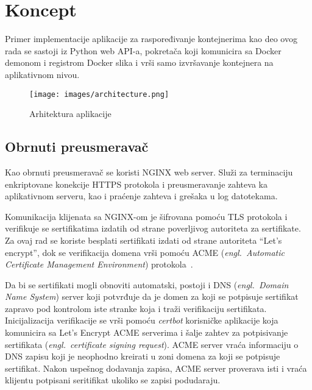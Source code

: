 \documentclass[12pt]{report}
\begin{document}

\chapter{Koncept}

Primer implementacije aplikacije za raspoređivanje kontejnerima kao deo ovog rada se sastoji iz Python web API-a, pokretača koji komunicira sa Docker demonom i registrom Docker slika i vrši samo izvršavanje kontejnera na aplikativnom nivou.

\begin{figure}[h!]
    \texttt{[image: images/architecture.png]}
    \caption{Arhitektura aplikacije}
\end{figure}

\section{Obrnuti preusmeravač}
Kao obrnuti preusmeravač se koristi NGINX web server. Služi za terminaciju enkriptovane konekcije \acrshort{HTTPS} protokola i preusmeravanje zahteva ka aplikativnom serveru, kao i praćenje zahteva i grešaka u log datotekama.

Komunikacija klijenata sa NGINX-om je šifrovana pomoću \acrshort{TLS} protokola i verifikuje se sertifikatima izdatih od strane poverljivog autoriteta za sertifikate. Za ovaj rad se koriste besplati sertifikati izdati od strane autoriteta ``Let's encrypt'', dok se verifikacija domena vrši pomoću ACME (\textit{engl.\ Automatic Certificate Management Environment}) protokola~\cite{acme}.

Da bi se sertifikati mogli obnoviti automatski, postoji i DNS (\textit{engl.\ Domain Name System}) server koji potvrđuje da je domen za koji se potpisuje sertifikat zapravo pod kontrolom iste stranke koja i traži verifikaciju sertifikata. Inicijalizacija verifikacije se vrši pomoću \textit{certbot} korisničke aplikacije koja komunicira sa Let's Encrypt ACME serverima i šalje zahtev za potpisivanje sertifikata (\textit{engl.\ certificate signing request}). ACME server vraća informaciju o DNS zapisu koji je neophodno kreirati u zoni domena za koji se potpisuje sertifikat. Nakon uspešnog dodavanja zapisa, ACME server proverava isti i vraća klijentu potpisani seritifikat ukoliko se zapisi podudaraju.
\end{document}
